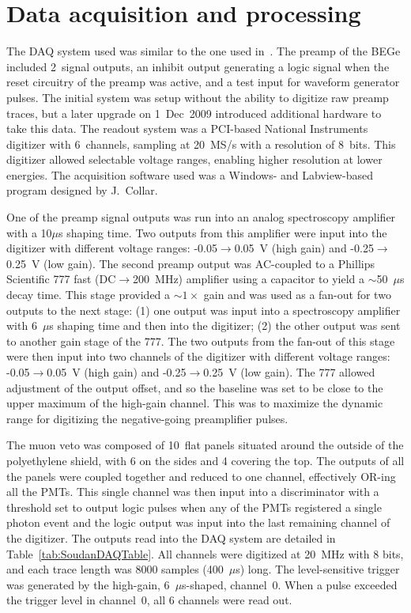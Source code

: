 	\section{Data acquisition and processing}
	\label{sec:BeGeDAQProcessing}
	
The DAQ system used was similar to the one used in~\cite{Aalseth:2008aa}.  The preamp of the BEGe included 2~signal outputs, an inhibit output generating a logic signal when the reset circuitry of the preamp was active, and a test input for waveform generator pulses.  The initial system was setup without the ability to digitize raw preamp traces, but a later upgrade on 1~Dec~2009 introduced additional hardware to take this data.  The readout system was a PCI-based National Instruments digitizer with 6~channels, sampling at 20~MS/s with a resolution of 8~bits.  This digitizer allowed selectable voltage ranges, enabling higher resolution at lower energies.  The acquisition software used was a Windows- and Labview-based program designed by J.~Collar.  

One of the preamp signal outputs was run into an analog spectroscopy amplifier with a 10$\mu$s shaping time.  Two outputs from this amplifier were input into the digitizer with different voltage ranges: -0.05$\to$0.05~V (high gain) and -0.25$\to$0.25~V (low gain).  The second preamp output was AC-coupled to a Phillips Scientific 777 fast (DC$\to$200~MHz) amplifier using a capacitor to yield a $\sim$50~$\mu$s decay time.  This stage provided a $\sim1\times$ gain and was used as a fan-out for two outputs to the next stage: (1) one output was input into a spectroscopy amplifier with 6~$\mu$s shaping time and then into the digitizer; (2) the other output was sent to another gain stage of the 777.  The two outputs from the fan-out of this stage were then input into two channels of the digitizer with different voltage ranges: -0.05$\to$0.05~V (high gain) and -0.25$\to$0.25~V (low gain).  The 777 allowed adjustment of the output offset, and so the baseline was set to be close to the upper maximum of the high-gain channel.  This was to maximize the dynamic range for digitizing the negative-going preamplifier pulses.  

The muon veto was composed of 10~flat panels situated around the outside of the polyethylene shield, with 6 on the sides and 4 covering the top.  The outputs of all the panels were coupled together and reduced to one channel, effectively OR-ing all the PMTs.  This single channel was then input into a discriminator with a threshold set to output logic pulses when any of the PMTs registered a single photon event and the logic output was input into the last remaining channel of the digitizer.  The outputs read into the DAQ system are detailed in Table~\ref{tab:SoudanDAQTable}.  All channels were digitized at 20~MHz with 8 bits, and each trace length was 8000 samples (400~$\mu$s) long.  The level-sensitive trigger was generated by the high-gain, 6~$\mu$s-shaped, channel~0.  When a pulse exceeded the trigger level in channel~0, all 6 channels were read out.  

